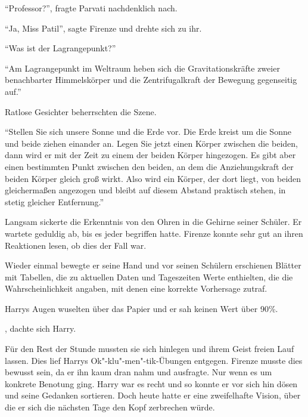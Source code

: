 \enquote{Professor?}, fragte Parvati nachdenklich nach.

\enquote{Ja, Miss Patil}, sagte Firenze und drehte sich zu ihr.

\enquote{Was ist der Lagrangepunkt?}

\enquote{Am Lagrangepunkt im Weltraum heben sich die Gravitationskräfte zweier benachbarter Himmelskörper und die Zentrifugalkraft der Bewegung gegenseitig auf.}

Ratlose Gesichter beherrschten die Szene.

\enquote{Stellen Sie sich unsere Sonne und die Erde vor. Die Erde kreist um die Sonne und beide ziehen einander an. Legen Sie jetzt einen Körper zwischen die beiden, dann wird er mit der Zeit zu einem der beiden Körper hingezogen. Es gibt aber einen bestimmten Punkt zwischen den beiden, an dem die Anziehungskraft der beiden Körper gleich groß wirkt. Also wird ein Körper, der dort liegt, von beiden gleichermaßen angezogen und bleibt auf diesem Abstand praktisch stehen, in stetig gleicher Entfernung.}

Langsam sickerte die Erkenntnis von den Ohren in die Gehirne seiner Schüler. Er wartete geduldig ab, bis es jeder begriffen hatte. Firenze konnte sehr gut an ihren Reaktionen lesen, ob dies der Fall war.

Wieder einmal bewegte er seine Hand und vor seinen Schülern erschienen Blätter mit Tabellen, die zu aktuellen Daten und Tageszeiten Werte enthielten, die die Wahrscheinlichkeit angaben, mit denen eine korrekte Vorhersage zutraf.

Harrys Augen wuselten über das Papier und er sah keinen Wert über 90\%.

, dachte sich Harry.

Für den Rest der Stunde mussten sie sich hinlegen und ihrem Geist freien Lauf lassen. Dies lief Harrys Ok"-klu"-men"-tik-Übungen entgegen. Firenze musste dies bewusst sein, da er ihn kaum dran nahm und ausfragte. Nur wenn es um konkrete Benotung ging. Harry war es recht und so konnte er vor sich hin dösen und seine Gedanken sortieren. Doch heute hatte er eine zweifelhafte Vision, über die er sich die nächsten Tage den Kopf zerbrechen würde.

